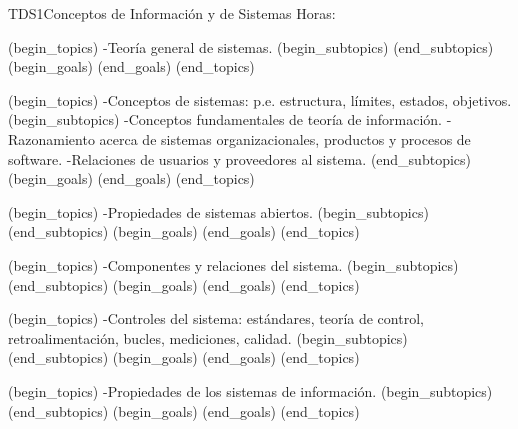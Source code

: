 \begin{BKL2}{TDS1}{Conceptos de Información y de Sistemas}
Horas:
 
(begin_topics)
-Teoría general de sistemas.
(begin_subtopics)
(end_subtopics)
(begin_goals)
(end_goals)
(end_topics)

 
(begin_topics)
-Conceptos de sistemas: p.e. estructura, límites, estados, objetivos.
(begin_subtopics)
-Conceptos fundamentales de teoría de información.
-Razonamiento acerca de sistemas organizacionales, productos y procesos de software.
-Relaciones de usuarios y proveedores al sistema.
(end_subtopics)
(begin_goals)
(end_goals)
(end_topics)

 

(begin_topics)
-Propiedades de sistemas abiertos.
(begin_subtopics)
(end_subtopics)
(begin_goals)
(end_goals)
(end_topics)

 
(begin_topics)
-Componentes y relaciones del sistema.
(begin_subtopics)
(end_subtopics)
(begin_goals)
(end_goals)
(end_topics)

 
(begin_topics)
-Controles del sistema: estándares, teoría de control, retroalimentación, bucles, mediciones, calidad.
(begin_subtopics)
(end_subtopics)
(begin_goals)
(end_goals)
(end_topics)

 
(begin_topics)
-Propiedades de los sistemas de información.
(begin_subtopics)
(end_subtopics)
(begin_goals)
(end_goals)
(end_topics)

\end{BKL2}



